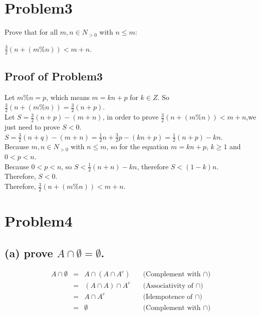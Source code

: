 \documentclass[]{article}
\begin{document}
\begin{spacing}{1.5}
\section*{Problem3}
Prove that for all $ m, n \in N _{> 0}$ with $n \leq m $:
\begin{center}
	$ \frac{3}{2}(n + (m \% n)) < m + n $.
\end{center}

\subsection*{Proof of Problem3}
Let $ m \% n = p $, which means $ m = kn+p $ for $ k \in Z $. So $ \frac{3}{2}(n + (m \% n)) = \frac{3}{2}(n + p) $.\\
Let $ S = \frac{3}{2}(n + p) - (m+n) $, in order to prove $ \frac{3}{2}(n + (m \% n)) < m + n $,we just need to prove $ S < 0 $.\\
$ S = \frac{3}{2}(n + q) - (m+n) = \frac{1}{2}n + \frac{3}{2}p -(kn+p) = \frac{1}{2}(n+p)-kn$.\\
Because $ m, n \in N _{> 0}$ with $n \leq m $, so for the equation $ m = kn+p $, $ k \geq 1 $ and $ 0<p<n $.\\
Because $ 0<p<n $, so $ S <  \frac{1}{2}(n+n)-kn$, therefore $ S < (1-k)n $.\\
Therefore, $ S<0. $\\
Therefore, $ \frac{3}{2}(n + (m \% n)) < m + n $.

\section*{Problem4}
\subsection*{(a) prove $ A \cap \emptyset = \emptyset $.}
\[
\begin{array}{rclr}
	A \cap  \emptyset &=& A \cap  (A \cap  A^{c} ) & \quad \text{(Complement with $\cap$)}\\
	                               &=& (A \cap  A) \cap  A^{c}  &\quad \text{(Associativity of $\cap$)}\\
	                               &=& A \cap  A^{c}  &\quad \text{(Idempotence of $\cap$)}\\
	                               &=& \emptyset  &\quad\text{(Complement with $\cap$)}
\end{array}
\]

\end{spacing}
\end{document}
